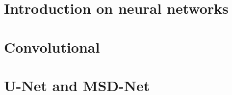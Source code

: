 \section{Introduction on neural networks}\label{chp:phasing}
\section{Convolutional}\label{chp:phasing}
\section{U-Net and MSD-Net}\label{chp:phasing}
